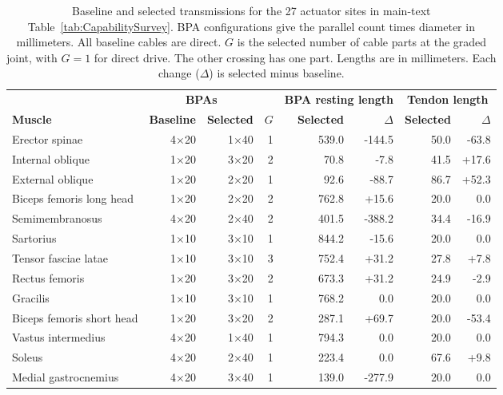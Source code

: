 \documentclass[utf8]{frontiers_suppmat} %
\renewcommand{\arraystretch}{1.5}  %
\begin{document}
\clearpage
\begin{table}[htbp]
\centering
\caption{Baseline and selected transmissions for the 27 actuator sites in main-text Table~\ref{tab:CapabilitySurvey}. BPA configurations give the parallel count times diameter in millimeters. All baseline cables are direct. $G$ is the selected number of cable parts at the graded joint, with $G=1$ for direct drive. The other crossing has one part. Lengths are in millimeters. Each change ($\Delta$) is selected minus baseline.}
\label{tab:survey_configurations}
\begingroup\small\renewcommand{\arraystretch}{1.12}
\setlength{\tabcolsep}{4pt}
\begin{tabular}{@{}lrrrrrrr@{}}
\toprule
& \multicolumn{2}{c}{\textbf{BPAs}} & & \multicolumn{2}{c}{\textbf{BPA resting length}} & \multicolumn{2}{c}{\textbf{Tendon length}}\\
\cmidrule(lr){2-3}\cmidrule(lr){5-6}\cmidrule(l){7-8}
\textbf{Muscle} & \textbf{Baseline} & \textbf{Selected} & \textbf{$G$} & \textbf{Selected} & \textbf{$\Delta$} & \textbf{Selected} & \textbf{$\Delta$}\\
\midrule
Erector spinae & 4$\times$20 & 1$\times$40 & 1 & 539.0 & -144.5 & 50.0 & -63.8 \\
Internal oblique & 1$\times$20 & 3$\times$20 & 2 & 70.8 & -7.8 & 41.5 & +17.6 \\
External oblique & 1$\times$20 & 2$\times$20 & 1 & 92.6 & -88.7 & 86.7 & +52.3 \\
Biceps femoris long head & 1$\times$20 & 2$\times$20 & 2 & 762.8 & +15.6 & 20.0 & 0.0 \\
Semimembranosus & 4$\times$20 & 2$\times$40 & 2 & 401.5 & -388.2 & 34.4 & -16.9 \\
Sartorius & 1$\times$10 & 3$\times$10 & 1 & 844.2 & -15.6 & 20.0 & 0.0 \\
Tensor fasciae latae & 1$\times$10 & 3$\times$10 & 3 & 752.4 & +31.2 & 27.8 & +7.8 \\
Rectus femoris & 1$\times$20 & 3$\times$20 & 2 & 673.3 & +31.2 & 24.9 & -2.9 \\
Gracilis & 1$\times$10 & 3$\times$10 & 1 & 768.2 & 0.0 & 20.0 & 0.0 \\
Biceps femoris short head & 1$\times$20 & 3$\times$20 & 2 & 287.1 & +69.7 & 20.0 & -53.4 \\
Vastus intermedius & 4$\times$20 & 1$\times$40 & 1 & 794.3 & 0.0 & 20.0 & 0.0 \\
Soleus & 4$\times$20 & 2$\times$40 & 1 & 223.4 & 0.0 & 67.6 & +9.8 \\
Medial gastrocnemius & 4$\times$20 & 3$\times$40 & 1 & 139.0 & -277.9 & 20.0 & 0.0 \\

\end{tabular}
\end{table}
\end{document}

